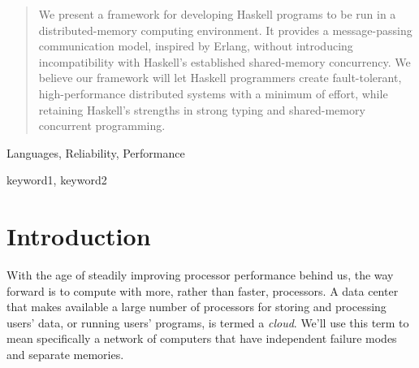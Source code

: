 \documentclass[preprint]{sigplanconf}
\begin{document}
\maketitle

\begin{abstract}
We present a framework for developing Haskell programs to be run in a distributed-memory computing environment. It provides a message-passing communication model, inspired by Erlang, without introducing incompatibility with Haskell's established shared-memory concurrency. We believe our framework will let Haskell programmers create fault-tolerant, high-performance distributed systems with a minimum of effort, while retaining Haskell's strengths in strong typing and shared-memory concurrent programming.

\end{abstract}


\terms
Languages, Reliability, Performance

\keywords
keyword1, keyword2

\section{Introduction}

With the age of steadily improving processor performance behind us, the way forward is to compute with more, rather than faster, processors. A data center that makes available a large number of processors for storing and processing users' data, or running users' programs, is termed a \emph{cloud}. We'll use this term to mean specifically a network of computers that have independent failure modes and separate memories.
\end{document}
